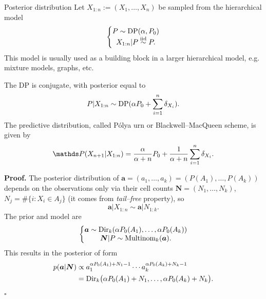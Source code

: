 \begin{frame}[allowframebreaks]{Posterior distribution}
	Let $X_{1:n} := (X_1,\ldots, X_n)$ be sampled from the hierarchical model 
\begin{equation*}
    \left \{ \begin{matrix}
P \sim \text{DP}(\alpha, P_0)\\ 
X_{1:n}|P \stackrel{\mbox{\scriptsize{iid}}}{\sim} P.
\end{matrix}\right.
\end{equation*}
This model is usually used as a building block in a larger hierarchical model, e.g. mixture models, graphs, etc. 
\begin{theorem} 
The DP is \alert{conjugate}, with posterior equal to
\begin{equation*}
    P|X_{1:n}\sim \text{DP}(\alpha P_0 + \sum_{i=1}^n\delta_{X_i}).
\end{equation*}
The \alert{predictive distribution}, called \alert{P\'olya urn} or \alert{Blackwell--MacQueen scheme}, is given by
\begin{equation*}
    \P(X_{n+1} | X_{1:n}) = \frac{\PrecisonParam}{\PrecisonParam +n} P_0 + \frac{1}{\PrecisonParam + n}\sum_{i=1}^n\delta_{X_i}.
\end{equation*}
\end{theorem}

\framebreak

\textbf{Proof.}
The posterior distribution of $\boldsymbol{a} = (a_1, \ldots, a_k) = ( P(A_1), \ldots, P(A_k) )$ depends on the observations only via their cell counts $\boldsymbol{N}= (N_1, \ldots, N_k)$, $N_j = \# \{ i : X_i \in A_j\}$  (it comes from \textit{tail--free} property), so
\begin{equation*}
  \boldsymbol{a} \vert X_{1:n}\sim \boldsymbol{a} \vert N_{1:k}.
\end{equation*}
The prior  and model are
\begin{equation*}
    \left \{ 
    \begin{matrix}
\boldsymbol{a} \sim \text{Dir}_k (\alpha P_0(A_1), \ldots, \alpha P_0(A_k))
\\
\boldsymbol{N}\vert P \sim {\rm Multinom}_k (\boldsymbol{a}).
\end{matrix}\right.
\end{equation*}
This results in the posterior of form 
\begin{align*}
    p(\boldsymbol{a}\vert \boldsymbol{N}) 
    &\propto a_1^{\alpha P_0(A_1) +N_1-1}\cdots a_k^{\alpha P_0(A_k)+N_k -1}\\ 
    &= \text{Dir}_k\big( \alpha P_0(A_1) +N_1, \ldots, \alpha P_0(A_k) +N_k\big).
\end{align*} \hfill $\square$
\end{frame}


